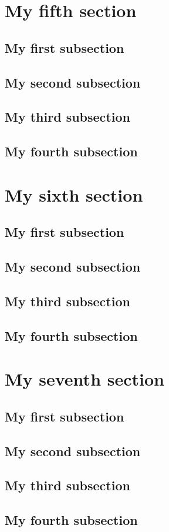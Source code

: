 \documentclass[fontsize=10pt,open=any,twocolumn]{scrbook}[2019/10/12]%
\begin{document}
    \section{My fifth section}
            \blindtext
        \subsection{My first subsection}
            \blindtext
        \subsection{My second subsection}
            \blindtext     
        \subsection{My third subsection}
            \blindtext
        \subsection{My fourth subsection}
            \blindtext  
    \section{My sixth section}
            \blindtext
        \subsection{My first subsection}
            \blindtext
        \subsection{My second subsection}
            \blindtext     
        \subsection{My third subsection}
            \blindtext
        \subsection{My fourth subsection}
            \blindtext    
    \section{My seventh section}
            \blindtext
        \subsection{My first subsection}
            \blindtext
        \subsection{My second subsection}
            \blindtext     
        \subsection{My third subsection}
            \blindtext
        \subsection{My fourth subsection}
            \blindtext           
\end{document}
